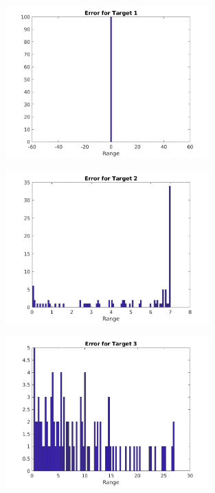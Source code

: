 \documentclass[a4paper,11pt]{article}
\begin{document}
\begin{figure}[!hp]
    \begin{center}
      \includegraphics[width=0.7\textwidth]{images/hist_e1_50.png}
    \end{center}
\end{figure}

\begin{figure}[!hp]
    \begin{center}
      \includegraphics[width=0.7\textwidth]{images/hist_e2_50.png}
    \end{center}
\end{figure}

\begin{figure}[!hp]
    \begin{center}
      \includegraphics[width=0.7\textwidth]{images/hist_e3_50.png}
    \end{center}
\end{figure}
\end{document}
